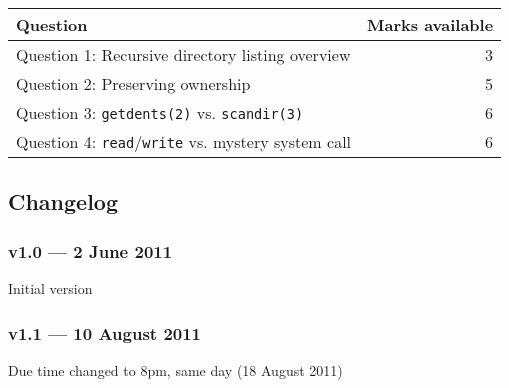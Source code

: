\documentclass[12pt,a4paper]{article}
\begin{document}
\begin{longtable}{p{13cm} r}
    \toprule
    \textbf{Question} & \textbf{Marks available} \\

    \midrule
    Question 1: Recursive directory listing overview & 3 \\
    Question 2: Preserving ownership & 5 \\
    Question 3: \texttt{getdents(2)} vs. \texttt{scandir(3)} & 6 \\
    Question 4: \texttt{read}\slash \texttt{write} vs. mystery system call & 6 \\

    \bottomrule
\end{longtable}

\subsection*{Changelog}

\subsubsection*{v1.0 --- 2 June 2011}
\begin{compactenum}
    \item Initial version
\end{compactenum}

\subsubsection*{v1.1 --- 10 August 2011}
\begin{compactenum}
    \item Due time changed to 8pm, same day (18 August 2011)
\end{compactenum}
\end{document}
